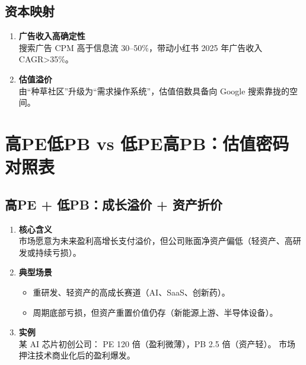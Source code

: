 \subsection{资本映射}
\begin{enumerate}[leftmargin=*, nosep]
    \item \textbf{广告收入高确定性}  \\
    搜索广告 CPM 高于信息流 30–50\%，带动小红书 2025 年广告收入 CAGR>35\%。
    \item \textbf{估值溢价}  \\
    由“种草社区”升级为“需求操作系统”，估值倍数具备向 Google 搜索靠拢的空间。
\end{enumerate}


\section{高PE低PB vs 低PE高PB：估值密码对照表}

\subsection{高PE + 低PB：成长溢价 + 资产折价}
\begin{enumerate}[leftmargin=*, nosep]
    \item \textbf{核心含义}  \\
    市场愿意为未来盈利高增长支付溢价，但公司账面净资产偏低（轻资产、高研发或持续亏损）。
    
    \item \textbf{典型场景}  
    \begin{itemize}[nosep]  
        \item 重研发、轻资产的高成长赛道（AI、SaaS、创新药）。  
        \item 周期底部亏损，但资产重置价值仍存（新能源上游、半导体设备）。  
    \end{itemize}
    
    \item \textbf{实例}  \\
    某 AI 芯片初创公司：  
    PE 120 倍（盈利微薄），PB 2.5 倍（资产轻）。  
    市场押注技术商业化后的盈利爆发。
\end{enumerate}

